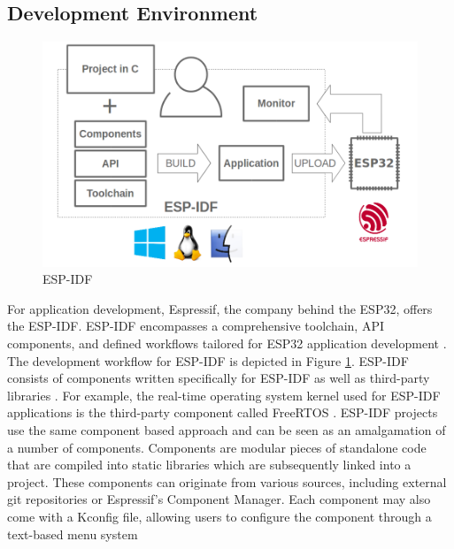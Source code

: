 \subsection{Development Environment}
\begin{figure}[ht!]
	\centering
	\includegraphics[scale=.5]{abbildungen/esp-idf.png}
	\caption{\ac{ESP-IDF} \cite[2805]{esp-prog}} \label{Fig:esp-idf}
\end{figure}
For application development, Espressif, the company behind the ESP32, offers the \ac{ESP-IDF}. \ac{ESP-IDF} encompasses a comprehensive toolchain, API components, and defined workflows tailored for ESP32 application development \cite[14]{esp-prog}. The development workflow for \ac{ESP-IDF} is depicted in Figure \ref{Fig:esp-idf}. \ac{ESP-IDF} consists of components written specifically for \ac{ESP-IDF} as well as third-party libraries \cite[2801]{esp-prog}. For example, the real-time operating system kernel used for \ac{ESP-IDF} applications is the third-party component called FreeRTOS \cite[2412]{esp-prog} \cite[6]{esp32-module}. \ac{ESP-IDF} projects use the same component based approach and can be seen as an amalgamation of a number of components. Components are modular pieces of standalone code that are compiled into static libraries which are subsequently linked into a project. These components can originate from various sources, including external git repositories or Espressif's Component Manager. Each component may also come with a Kconfig file, allowing users to configure the component through a text-based menu system \cite[2412-2413]{esp-prog}   


